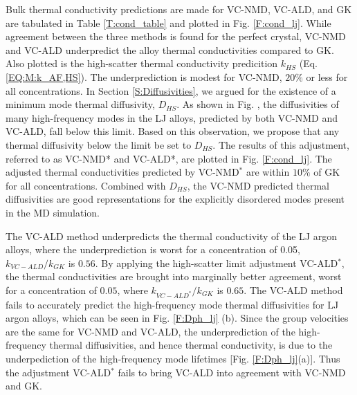 \documentclass[aps,prb,onecolumn,preprint,superscriptaddress,amsmath,amssymb,floatfix]{revtex4}
\newcommand{\kw}{\mspace{-4.0mu}\left(\mspace{-8.0mu}
\begin{smallmatrix}&\pmb{\kappa} \\&\omega\end{smallmatrix}
\mspace{-3.0mu}\right)}
\begin{document}
Bulk thermal conductivity predictions are made for 
VC-NMD, VC-ALD, and GK are tabulated in Table \ref{T:cond_table} 
and plotted in Fig. \ref{F:cond_lj}.   
While agreement between the three methods is found for the perfect 
crystal, VC-NMD and VC-ALD underpredict the alloy thermal 
conductivities compared to GK. Also plotted is the high-scatter 
thermal conductivity predicition $k_{HS}$ 
(Eq. \eqref{EQ:M:k_AF,HS}). 
The underprediction is modest for VC-NMD, $20\%$ or less 
for all concentrations. 
In Section \ref{S:Diffusivities}, 
we argued for the existence of a minimum mode thermal 
diffusivity, $D_{HS}$. As shown in Fig. , the diffusivities of 
many high-frequency modes in the LJ alloys, predicted by both VC-NMD 
and VC-ALD, fall below this limit.  Based on this observation, we propose 
that any thermal diffusivity below the limit be set to $D_{HS}$. 
The results of this adjustment, 
referred to as VC-NMD* and VC-ALD*, are plotted in Fig. \ref{F:cond_lj}. 
The adjusted thermal conductivities predicted by VC-NMD$^*$ are 
within $10\%$ of GK for all concentrations. 
Combined with $D_{HS}$, the VC-NMD predicted thermal 
diffusivities are good representations for the explicitly 
disordered modes present in the MD simulation. 

The VC-ALD method underpredicts the thermal conductivity of the 
LJ argon alloys, where 
the underprediction is worst for a concentration of 0.05, 
$k_{VC-ALD} / k_{GK}$ is $0.56$. 
By applying the high-scatter limit 
adjustment VC-ALD$^*$, the thermal conductivities are brought into 
marginally 
better agreement, worst for a concentration of $0.05$, where 
$k_{VC-ALD^*} / k_{GK}$ is $0.65$.  
The VC-ALD method fails to 
accurately predict the high-frequency mode thermal diffusivities for 
LJ argon alloys, which can be seen in Fig. \ref{F:Dph_lj} (b).  
Since the group velocities are the same for VC-NMD and VC-ALD, 
the underprediction of the high-frequency thermal diffusivities, and 
hence thermal conductivity, is 
due to the underpediction of the high-frequency 
mode lifetimes [Fig. \ref{F:Dph_lj}(a)]. Thus the adjustment 
VC-ALD$^*$ fails to bring VC-ALD into agreement with VC-NMD and GK. 

\end{document}
